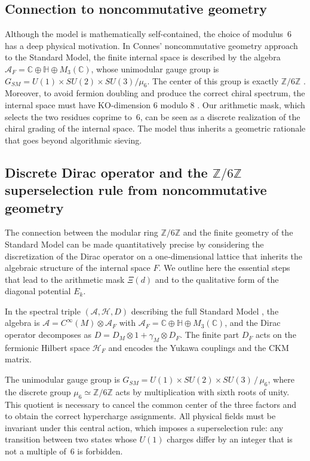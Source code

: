 \documentclass[11pt,a4paper]{article}
\newcommand{\Zmod}{\mathbb{Z}/6\mathbb{Z}}
\begin{document}
\subsection{Connection to noncommutative geometry}

Although the model is mathematically self-contained, the choice of modulus~6 has a deep physical motivation. In Connes' noncommutative geometry approach to the Standard Model, the finite internal space is described by the algebra $\mathcal{A}_F = \mathbb{C}\oplus\mathbb{H}\oplus M_3(\mathbb{C})$, whose unimodular gauge group is $G_{SM} = U(1)\times SU(2)\times SU(3)/\mu_6$. The center of this group is exactly $\mathbb{Z}/6\mathbb{Z}$ \cite{Connes2008}. Moreover, to avoid fermion doubling and produce the correct chiral spectrum, the internal space must have KO-dimension $6$ modulo $8$ \cite{Chamseddine2007}. Our arithmetic mask, which selects the two residues coprime to~6, can be seen as a discrete realization of the chiral grading of the internal space. The model thus inherits a geometric rationale that goes beyond algorithmic sieving.

\subsection{Discrete Dirac operator and the \texorpdfstring{$\mathbb{Z}/6\mathbb{Z}$}{Z/6Z} superselection rule from noncommutative geometry}
\label{sec:ncg_discrete}

The connection between the modular ring $\Zmod$ and the finite geometry of the Standard Model can be made quantitatively precise by considering the discretization of the Dirac operator on a one‑dimensional lattice that inherits the algebraic structure of the internal space $F$. We outline here the essential steps that lead to the arithmetic mask $\Xi(d)$ and to the qualitative form of the diagonal potential $E_k$.

In the spectral triple $(\mathcal{A}, \mathcal{H}, D)$ describing the full Standard Model \cite{Connes2008,Chamseddine2007}, the algebra is $\mathcal{A}=C^\infty(M)\otimes \mathcal{A}_F$ with $\mathcal{A}_F=\mathbb{C}\oplus\mathbb{H}\oplus M_3(\mathbb{C})$, and the Dirac operator decomposes as $D = D_M\otimes 1 + \gamma_M\otimes D_F$. The finite part $D_F$ acts on the fermionic Hilbert space $\mathcal{H}_F$ and encodes the Yukawa couplings and the CKM matrix.

The unimodular gauge group is $G_{SM}=U(1)\times SU(2)\times SU(3)\,/\,\mu_6$, where the discrete group $\mu_6\simeq\Zmod$ acts by multiplication with sixth roots of unity. This quotient is necessary to cancel the common center of the three factors and to obtain the correct hypercharge assignments. All physical fields must be invariant under this central action, which imposes a superselection rule: any transition between two states whose $U(1)$ charges differ by an integer that is not a multiple of~6 is forbidden.
\end{document}
